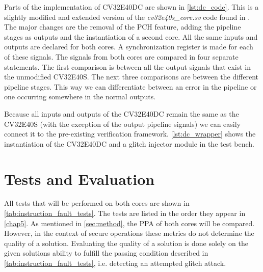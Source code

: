Parts of the implementation of CV32E40DC are shown in \autoref{lst:dc_code}. This is a slightly modified and extended version of the \textit{cv32e40s\_core.sv} code found in \cite{cv32e40s_github}. The major changes are the removal of the PCH feature, adding the pipeline stages as outputs and the instantiation of a second core. All the same inputs and outputs are declared for both cores. A synchronization register is made for each of these signals. The signals from both cores are compared in four separate statements. The first comparison is between all the output signals that exist in the unmodified CV32E40S. The next three comparisons are between the different pipeline stages. This way we can differentiate between an error in the pipeline or one occurring somewhere in the normal outputs. 

Because all inputs and outputs of the CV32E40DC remain the same as the CV32E40S (with the exception of the output pipeline signals) we can easily connect it to the pre-existing verification framework. \autoref{lst:dc_wrapper} shows the instantiation of the CV32E40DC and a glitch injector module in the test bench.


\section{Tests and Evaluation}

All tests that will be performed on both cores are shown in \autoref{tab:instruction_fault_tests}. The tests are listed in the order they appear in \autoref{chap5}. As mentioned in \autoref{sec:method}, the PPA of both cores will be compared. However, in the context of secure operations these metrics do not determine the quality of a solution. Evaluating the quality of a solution is done solely on the given solutions ability to fulfill the passing condition described in \autoref{tab:instruction_fault_tests}, i.e. detecting an attempted glitch attack. 


